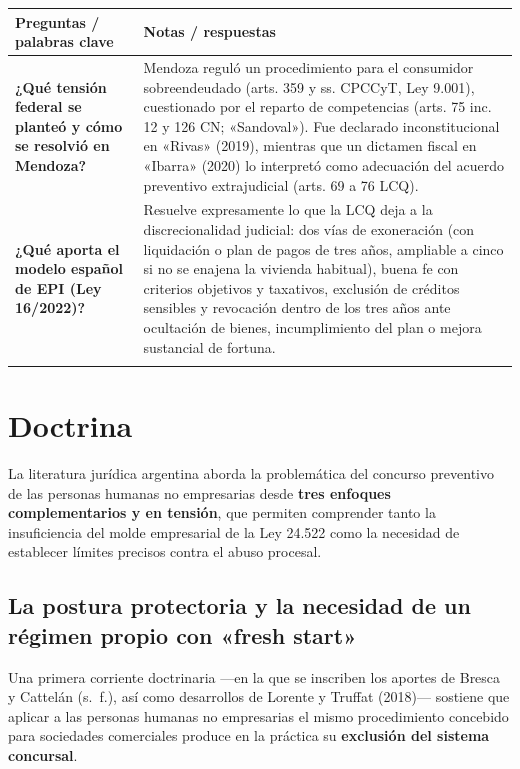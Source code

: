 \documentclass[12pt,oneside]{book}
\makeatletter
\newcommand{\cornellrow}[2]{\textbf{#1} & #2 \\ \addlinespace[0.8em]}
\newenvironment{cornell}[1]{%
    \par\medskip
    \noindent{\large\bfseries Cuadro Cornell --- #1}\par\smallskip
    \begin{longtable}{@{}>{\raggedright\arraybackslash}p{0.25\textwidth}>{\raggedright\arraybackslash}p{0.69\textwidth}@{}}
    \toprule
    \textbf{Preguntas / palabras clave} & \textbf{Notas / respuestas} \\
    \midrule
    \endhead
}{%
    \bottomrule
    \end{longtable}
}
\newcommand{\cornellsummary}[1]{%
    \midrule
    \multicolumn{2}{@{}p{\dimexpr0.94\textwidth+2\tabcolsep\relax}@{}}{\textbf{Resumen:} #1} \\
}
\makeatother
\begin{document}
\begin{cornell}{Análisis normativo}
\cornellrow{¿Qué tensión federal se planteó y cómo se resolvió en Mendoza?}{Mendoza reguló un procedimiento para el consumidor sobreendeudado (arts. 359 y ss. CPCCyT, Ley 9.001), cuestionado por el reparto de competencias (arts. 75 inc. 12 y 126 CN; «Sandoval»). Fue declarado inconstitucional en «Rivas» (2019), mientras que un dictamen fiscal en «Ibarra» (2020) lo interpretó como adecuación del acuerdo preventivo extrajudicial (arts. 69 a 76 LCQ).}
\cornellrow{¿Qué aporta el modelo español de EPI (Ley 16/2022)?}{Resuelve expresamente lo que la LCQ deja a la discrecionalidad judicial: dos vías de exoneración (con liquidación o plan de pagos de tres años, ampliable a cinco si no se enajena la vivienda habitual), buena fe con criterios objetivos y taxativos, exclusión de créditos sensibles y revocación dentro de los tres años ante ocultación de bienes, incumplimiento del plan o mejora sustancial de fortuna.}
\cornellsummary{La LCQ admite como sujeto a toda persona humana (art. 2°) pero conserva un presupuesto objetivo (cesación de pagos), requisitos formales y costos pensados para la empresa; los pequeños concursos son una simplificación cosmética. El único control expreso del abuso está en el art. 52 inc. 4° y debe integrarse con el CCyCN y el derecho del consumidor. Ante el vacío nacional, Mendoza legisló con resultados controvertidos, y el modelo español de EPI muestra una alternativa con criterios objetivos de buena fe.}
\end{cornell}

\chapter[Doctrina]{Doctrina}

La literatura jurídica argentina aborda la problemática del concurso preventivo de las personas humanas no empresarias desde \textbf{tres enfoques complementarios y en tensión}, que permiten comprender tanto la insuficiencia del molde empresarial de la Ley 24.522 como la necesidad de establecer límites precisos contra el abuso procesal.

\section{La postura protectoria y la necesidad de un régimen propio con «fresh start»}

Una primera corriente doctrinaria ---en la que se inscriben los aportes de Bresca y Cattelán (s.~f.), así como desarrollos de Lorente y Truffat (2018)--- sostiene que aplicar a las personas humanas no empresarias el mismo procedimiento concebido para sociedades comerciales produce en la práctica su \textbf{exclusión del sistema concursal}.
\end{document}
